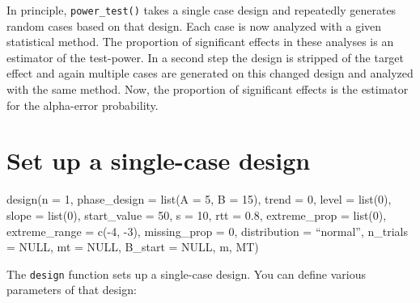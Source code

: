 \documentclass[
  letterpaper,
  DIV=11,
  numbers=noendperiod]{scrreprt}
\begin{document}
In principle, \texttt{power\_test()} takes a single case design and
repeatedly generates random cases based on that design. Each case is now
analyzed with a given statistical method. The proportion of significant
effects in these analyses is an estimator of the test-power. In a second
step the design is stripped of the target effect and again multiple
cases are generated on this changed design and analyzed with the same
method. Now, the proportion of significant effects is the estimator for
the alpha-error probability.

\hypertarget{set-up-a-single-case-design}{%
\section{Set up a single-case
design}\label{set-up-a-single-case-design}}

\begin{tcolorbox}[enhanced jigsaw, toprule=.15mm, colframe=quarto-callout-tip-color-frame, left=2mm, colback=white, breakable, bottomrule=.15mm, arc=.35mm, rightrule=.15mm, leftrule=.75mm, opacityback=0]
\begin{minipage}[t]{5.5mm}
\textcolor{quarto-callout-tip-color}{\faLightbulb}
\end{minipage}%
\begin{minipage}[t]{\textwidth - 5.5mm}
design(n = 1, phase\_design = list(A = 5, B = 15), trend = 0, level =
list(0), slope = list(0), start\_value = 50, s = 10, rtt = 0.8,
extreme\_prop = list(0), extreme\_range = c(-4, -3), missing\_prop = 0,
distribution = ``normal'', n\_trials = NULL, mt = NULL, B\_start = NULL,
m, MT)\end{minipage}%
\end{tcolorbox}

The \texttt{design} function sets up a single-case design. You can
define various parameters of that design:
\end{document}
